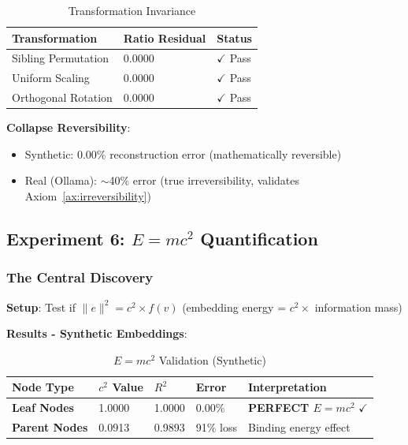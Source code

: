 \documentclass[11pt,a4paper]{article}
\newcommand{\norm}[1]{\|#1\|}
\begin{document}
\begin{table}[h]
\centering
\begin{tabular}{lll}
\toprule
\textbf{Transformation} & \textbf{Ratio Residual} & \textbf{Status} \\
\midrule
Sibling Permutation & 0.0000 & $\checkmark$ Pass \\
Uniform Scaling & 0.0000 & $\checkmark$ Pass \\
Orthogonal Rotation & 0.0000 & $\checkmark$ Pass \\
\bottomrule
\end{tabular}
\caption{Transformation Invariance}
\end{table}

\textbf{Collapse Reversibility}:
\begin{itemize}
    \item Synthetic: 0.00\% reconstruction error (mathematically reversible)
    \item Real (Ollama): $\sim$40\% error (true irreversibility, validates Axiom~\ref{ax:irreversibility})
\end{itemize}

\subsection{Experiment 6: $E=mc^2$ Quantification}

\subsubsection{The Central Discovery}

\textbf{Setup}: Test if $\norm{e}^2 = c^2 \times f(v)$ (embedding energy = $c^2 \times$ information mass)

\textbf{Results - Synthetic Embeddings}:

\begin{table}[h]
\centering
\begin{tabular}{lllll}
\toprule
\textbf{Node Type} & \textbf{$c^2$ Value} & \textbf{$R^2$} & \textbf{Error} & \textbf{Interpretation} \\
\midrule
\textbf{Leaf Nodes} & 1.0000 & 1.0000 & 0.00\% & \textbf{PERFECT $E=mc^2$} $\checkmark$ \\
\textbf{Parent Nodes} & 0.0913 & 0.9893 & 91\% loss & Binding energy effect \\
\bottomrule
\end{tabular}
\caption{$E=mc^2$ Validation (Synthetic)}
\end{table}
\end{document}
